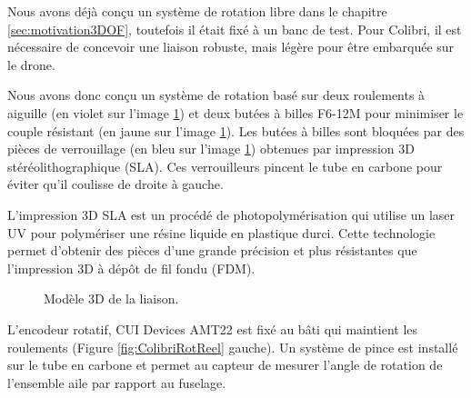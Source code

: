 Nous avons déjà conçu un système de rotation libre dans le chapitre \ref{sec:motivation3DOF}, toutefois il était fixé à un banc de test. Pour Colibri, il est nécessaire de concevoir une liaison robuste, mais légère pour être embarquée sur le drone. 

Nous avons donc conçu un système de rotation basé sur deux roulements à aiguille (en violet sur l'image \ref{fig:ColibriRot}) et deux butées à billes F6-12M pour minimiser le couple résistant (en jaune sur l'image \ref{fig:ColibriRot}). Les butées à  billes sont bloquées par des pièces de verrouillage (en bleu sur l'image \ref{fig:ColibriRot}) obtenues par impression 3D stéréolithographique (SLA). Ces verrouilleurs pincent le tube en carbone pour éviter qu'il coulisse de droite à gauche. 

L'impression 3D SLA est un procédé de photopolymérisation qui utilise un laser UV pour polymériser une résine liquide en plastique durci. Cette technologie permet d'obtenir des pièces d'une grande précision et plus résistantes que l'impression 3D à dépôt de fil fondu (FDM).





\begin{figure}[H]
    \centering
    \caption{Modèle 3D de la liaison.}
    \label{fig:ColibriRot}
\end{figure}

L'encodeur rotatif, CUI Devices AMT22 est fixé au bâti qui maintient les roulements (Figure \ref{fig:ColibriRotReel} gauche). Un système de pince est installé sur le tube en carbone et permet au capteur de mesurer l'angle de rotation de l'ensemble aile par rapport au fuselage.

